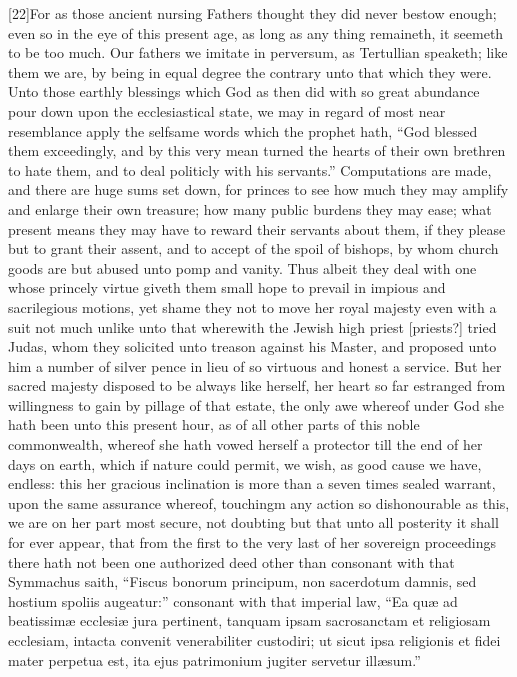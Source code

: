 [22]For as those ancient nursing Fathers thought they did never bestow enough; even so in the eye of this present age, as long as any thing remaineth, it seemeth to be too much. Our fathers we imitate in perversum, as Tertullian speaketh; like them we are, by being in equal degree the contrary unto that which they were. Unto those earthly blessings which God as then did with so great abundance pour down upon the ecclesiastical state, we may in regard of most near resemblance  apply the selfsame words which the prophet hath, “God blessed them exceedingly, and by this very mean turned the hearts of their own brethren to hate them, and to deal politicly with his servants.” Computations are made, and there are huge sums set down, for princes to see how much they may amplify and enlarge their own treasure; how many public burdens they may ease; what present means they may have to reward their servants about them, if they please but to grant their assent, and to accept of the spoil of bishops, by whom church goods are but abused unto pomp and vanity. Thus albeit they deal with one whose princely virtue giveth them small hope to prevail in impious and sacrilegious motions, yet shame they not to move her royal majesty even with a suit not much unlike unto that wherewith the Jewish high priest [priests?] tried Judas, whom they solicited unto treason against his Master, and proposed unto him a number of silver pence in lieu of so virtuous and honest a service. But her sacred majesty disposed to be always like herself, her heart so far estranged from willingness to gain by pillage of that estate, the only awe whereof under God she hath been unto this present hour, as of all other parts of this noble commonwealth, whereof she hath vowed herself a protector till the end of her days on earth, which if nature could permit, we wish, as good cause we have, endless: this her gracious inclination is more than a seven times sealed warrant, upon the same assurance whereof, touchingm any action so dishonourable as this, we are on her part most secure, not doubting but that unto all posterity it shall for ever appear, that from the first to the very last of her sovereign proceedings there hath not been one authorized deed other than consonant with that Symmachus saith, “Fiscus bonorum principum, non sacerdotum damnis, sed hostium spoliis augeatur:” consonant with that imperial law, “Ea quæ ad beatissimæ ecclesiæ jura pertinent, tanquam ipsam sacrosanctam et religiosam ecclesiam, intacta convenit  venerabiliter custodiri; ut sicut ipsa religionis et fidei mater perpetua est, ita ejus patrimonium jugiter servetur illæsum.”

